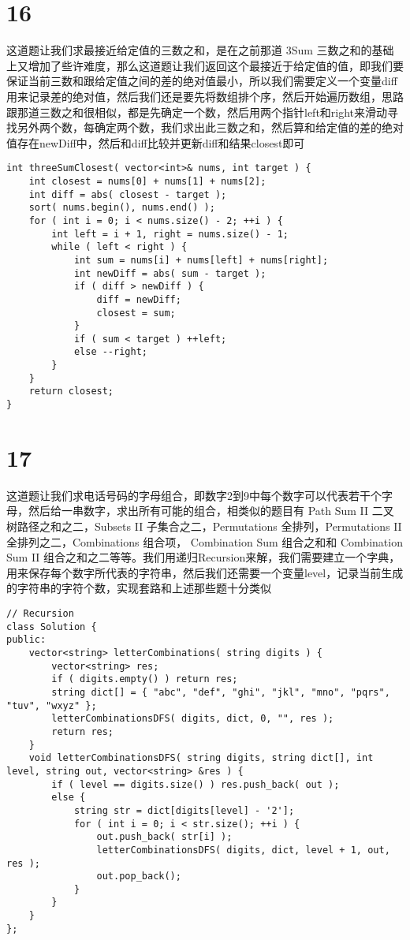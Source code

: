 \documentclass[12pt,a4paper]{article}
\begin{document}
\section{16}
\begin{CJK}{UTF8}{gbsn}
这道题让我们求最接近给定值的三数之和，是在之前那道 3Sum 三数之和的基础上又增加了些许难度，那么这道题让我们返回这个最接近于给定值的值，即我们要保证当前三数和跟给定值之间的差的绝对值最小，所以我们需要定义一个变量diff用来记录差的绝对值，然后我们还是要先将数组排个序，然后开始遍历数组，思路跟那道三数之和很相似，都是先确定一个数，然后用两个指针left和right来滑动寻找另外两个数，每确定两个数，我们求出此三数之和，然后算和给定值的差的绝对值存在newDiff中，然后和diff比较并更新diff和结果closest即可
\end{CJK}
\begin{lstlisting}
int threeSumClosest( vector<int>& nums, int target ) {
	int closest = nums[0] + nums[1] + nums[2];
	int diff = abs( closest - target );
	sort( nums.begin(), nums.end() );
	for ( int i = 0; i < nums.size() - 2; ++i ) {
		int left = i + 1, right = nums.size() - 1;
		while ( left < right ) {
			int sum = nums[i] + nums[left] + nums[right];
			int newDiff = abs( sum - target );
			if ( diff > newDiff ) {
				diff = newDiff;
				closest = sum;
			}
			if ( sum < target ) ++left;
			else --right;
		}
	}
	return closest;
}
\end{lstlisting}

\section{17}
\begin{CJK}{UTF8}{gbsn}
这道题让我们求电话号码的字母组合，即数字2到9中每个数字可以代表若干个字母，然后给一串数字，求出所有可能的组合，相类似的题目有 Path Sum II 二叉树路径之和之二，Subsets II 子集合之二，Permutations 全排列，Permutations II 全排列之二，Combinations 组合项， Combination Sum 组合之和和 Combination Sum II 组合之和之二等等。我们用递归Recursion来解，我们需要建立一个字典，用来保存每个数字所代表的字符串，然后我们还需要一个变量level，记录当前生成的字符串的字符个数，实现套路和上述那些题十分类似
\end{CJK}
\begin{lstlisting}
// Recursion
class Solution {
public:
	vector<string> letterCombinations( string digits ) {
		vector<string> res;
		if ( digits.empty() ) return res;
		string dict[] = { "abc", "def", "ghi", "jkl", "mno", "pqrs", "tuv", "wxyz" };
		letterCombinationsDFS( digits, dict, 0, "", res );
		return res;
	}
	void letterCombinationsDFS( string digits, string dict[], int level, string out, vector<string> &res ) {
		if ( level == digits.size() ) res.push_back( out );
		else {
			string str = dict[digits[level] - '2'];
			for ( int i = 0; i < str.size(); ++i ) {
				out.push_back( str[i] );
				letterCombinationsDFS( digits, dict, level + 1, out, res );
				out.pop_back();
			}
		}
	}
};
\end{lstlisting}
\end{document}
